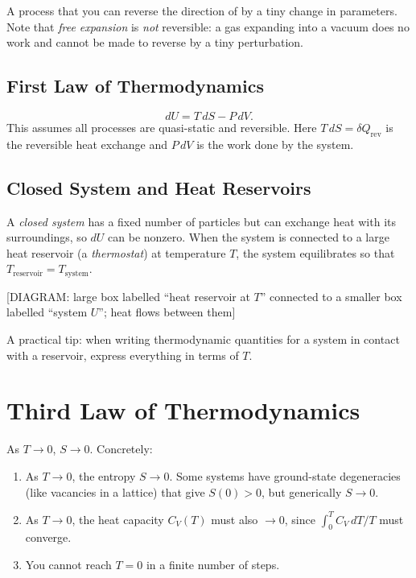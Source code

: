 \begin{definition}
A process that you can reverse the direction of by a tiny change in parameters. Note that \emph{free expansion} is \emph{not} reversible: a gas expanding into a vacuum does no work and cannot be made to reverse by a tiny perturbation.
\end{definition}

\section{First Law of Thermodynamics}

\begin{theorem}
\begin{equation}
    dU = T\,dS - P\,dV.
\end{equation}
This assumes all processes are quasi-static and reversible. Here $T\,dS = \delta Q_{\text{rev}}$ is the reversible heat exchange and $P\,dV$ is the work done by the system.
\end{theorem}

\section{Closed System and Heat Reservoirs}

A \emph{closed system} has a fixed number of particles but can exchange heat with its surroundings, so $dU$ can be nonzero. When the system is connected to a large heat reservoir (a \emph{thermostat}) at temperature $T$, the system equilibrates so that $T_{\text{reservoir}} = T_{\text{system}}$.

\begin{center}[DIAGRAM: large box labelled ``heat reservoir at $T$'' connected to a smaller box labelled ``system $U$''; heat flows between them]\end{center}

A practical tip: when writing thermodynamic quantities for a system in contact with a reservoir, express everything in terms of $T$.

\chapter{Third Law of Thermodynamics}

\begin{theorem}
As $T \to 0$, $S \to 0$. Concretely:
\begin{enumerate}
    \item As $T \to 0$, the entropy $S \to 0$.  Some systems have ground-state degeneracies (like vacancies in a lattice) that give $S(0) > 0$, but generically $S \to 0$.
    \item As $T \to 0$, the heat capacity $C_V(T)$ must also $\to 0$, since $\int_0^T C_V\,dT/T$ must converge.
    \item You cannot reach $T = 0$ in a finite number of steps.
\end{enumerate}
\end{theorem}

